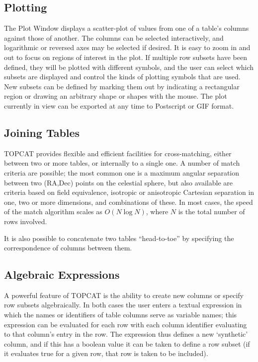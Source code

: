 \documentclass[11pt,twoside]{article}  %
\begin{document}
\subsection{Plotting}

The Plot Window displays a scatter-plot of values from one of a table's
columns against those of another.  The columns can be selected 
interactively, and logarithmic or reversed axes may be selected if
desired.  It is easy to zoom in and out to focus on regions of interest
in the plot.  If multiple row subsets have been defined, they will be
plotted with different symbols, and the user can select which subsets are 
displayed and control the kinds of plotting symbols that are used.  
New subsets can be defined by marking them out by 
indicating a rectangular region or drawing an arbitrary shape or shapes
with the mouse.
The plot currently in view can be exported at any time to Postscript or
GIF format.

\subsection{Joining Tables}

TOPCAT provides flexible and efficient facilities for cross-matching,
either between two or more tables, or internally to a single one.
A number of match criteria are possible; the most common one is
a maximum angular separation between two (RA,Dec) points on the
celestial sphere, but also available are criteria based on 
field equivalence, isotropic or anisotropic Cartesian separation
in one, two or more dimensions, and combinations of these.
In most cases, the speed of the match algorithm
scales as $O(N \log N)$, where $N$ is the total number of rows
involved.

It is also possible to concatenate two tables ``head-to-toe'' by
specifying the correspondence of columns between them.

\subsection{Algebraic Expressions}

A powerful feature of TOPCAT is the ability to create new columns 
or specify row subsets algebraically.  In both cases the user 
enters a textual expression in which the names or identifiers of
table columns serve as variable names; this expression 
can be evaluated for each row with each column identifier evaluating
to that column's entry in the row.  The expression thus defines a
new `synthetic' column, and if this has a boolean value it can be
taken to define a row subset (if it evaluates true for a given row,
that row is taken to be included).
\end{document}
